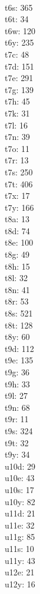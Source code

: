 \begin{multicols}{8}
  \\t6s: 365
  \\t6t: 34
  \\t6w: 120
  \\t6y: 235
  \\t7c: 48
  \\t7d: 151
  \\t7e: 291
  \\t7g: 139
  \\t7h: 45
  \\t7k: 31
  \\t7l: 16
  \\t7n: 39
  \\t7o: 11
  \\t7r: 13
  \\t7s: 250
  \\t7t: 406
  \\t7x: 17
  \\t7y: 166
  \\t8a: 13
  \\t8d: 74
  \\t8e: 100
  \\t8g: 49
  \\t8h: 15
  \\t8l: 32
  \\t8n: 41
  \\t8r: 53
  \\t8s: 521
  \\t8t: 128
  \\t8y: 60
  \\t9d: 112
  \\t9e: 135
  \\t9g: 36
  \\t9h: 33
  \\t9l: 27
  \\t9n: 68
  \\t9r: 11
  \\t9s: 324
  \\t9t: 32
  \\t9y: 34
  \\u10d: 29
  \\u10e: 43
  \\u10s: 17
  \\u10y: 82
  \\u11d: 21
  \\u11e: 32
  \\u11g: 85
  \\u11s: 10
  \\u11y: 43
  \\u12e: 21
  \\u12y: 16

\end{multicols}
